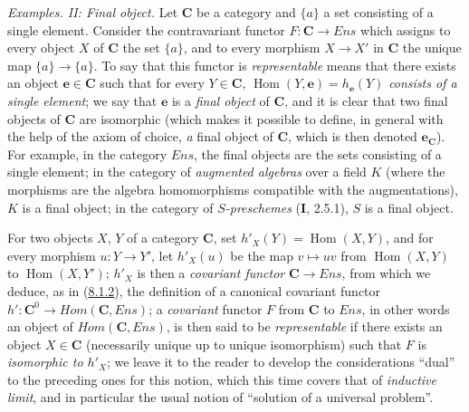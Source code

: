 \begin{env}[8.1.10]
\label{0.8.1.10}
\textit{Examples. II: Final object.} Let $\boldsymbol{C}$ be a category and $\{a\}$ a
set consisting of a single element. Consider the contravariant functor
$F:\boldsymbol{C}\to\boldsymbol{\mathit{Ens}}$ which assigns to every object $X$ of $\boldsymbol{C}$
the set $\{a\}$, and to every morphism $X\to X'$ in $\boldsymbol{C}$ the unique
map $\{a\}\to\{a\}$. To say that this functor is \emph{representable}
means that there exists an object $\boldsymbol{e}\in\boldsymbol{C}$ such that for every $Y\in\boldsymbol{C}$,
$\operatorname{Hom}(Y,\boldsymbol{e})=h_{\mathbf{e}}(Y)$ \emph{consists of a single element}; we say
that $\boldsymbol{e}$ is a \emph{final object} of $\boldsymbol{C}$, and it is clear that two final
objects of $\boldsymbol{C}$ are isomorphic (which makes it possible to define, in general
with the help of the axiom of choice, \emph{a} final object of $\boldsymbol{C}$, which is then
denoted $\boldsymbol{e}_{\mathbf{C}}$). For example, in the category $\boldsymbol{\mathit{Ens}}$, the final objects
are the sets consisting of a single element; in the category of
\emph{augmented algebras} over a field $K$ (where the morphisms are the
algebra homomorphisms compatible with the augmentations), $K$ is a final
object; in the category of \emph{$S$-preschemes} (\textbf{I}, 2.5.1), $S$ is a final
object.
\end{env}

\begin{env}[8.1.11]
\label{0.8.1.11}
For two objects $X$, $Y$ of a category $\boldsymbol{C}$, set
$h'_X(Y)=\operatorname{Hom}(X,Y)$, and for every morphism $u:Y\to Y'$, let
$h'_X(u)$ be the map $v\mapsto uv$ from $\operatorname{Hom}(X,Y)$ to
$\operatorname{Hom}(X,Y')$; $h'_X$ is then a \emph{covariant functor}
$\boldsymbol{C}\to\boldsymbol{\mathit{Ens}}$, from which we deduce, as in
(\hyperref[0.8.1.2]{8.1.2}), the definition of a canonical covariant
functor $h':\boldsymbol{C}^0\to\boldsymbol{\mathit{Hom}}(\boldsymbol{C},\boldsymbol{\mathit{Ens}})$; a \emph{covariant}
functor $F$ from $\boldsymbol{C}$ to $\boldsymbol{\mathit{Ens}}$, in other words an object of
$\boldsymbol{\mathit{Hom}}(\boldsymbol{C},\boldsymbol{\mathit{Ens}})$, is then said to be \emph{representable}
if there exists an object $X\in\boldsymbol{C}$ (necessarily unique up to unique
isomorphism) such that $F$ is \emph{isomorphic to $h'_X$}; we leave it to the
reader to develop the considerations ``dual'' to the preceding ones for
this notion, which this time covers that of \emph{inductive limit}, and in
particular the usual notion of ``solution of a universal problem''.
\end{env}

